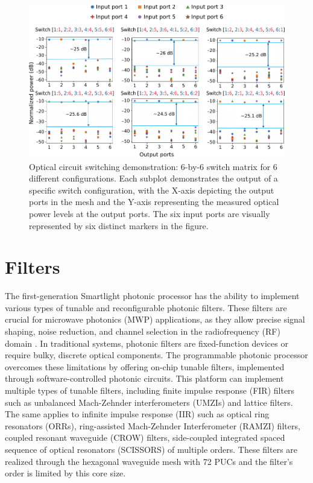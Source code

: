 \begin{figure}
	\begin{center}
		\includegraphics{figures/ch3-ocs_power_meter.pdf}
	\end{center}
	\caption{Optical circuit switching demonstration:
		6-by-6 switch matrix for 6 different configurations.
		Each subplot demonstrates the output of a specific switch configuration, with the X-axis depicting the output ports in the mesh and the Y-axis representing the measured optical power levels at the output ports.
		The six input ports are visually represented by six distinct markers in the figure.
	}\label{fig:ch3-ocs_power_meter}
\end{figure}


\section{Filters}\label{sec:filters} %

The first-generation Smartlight photonic processor has the ability to implement various types of tunable and reconfigurable photonic filters.
These filters are crucial for microwave photonics (MWP) applications, as they allow precise signal shaping, noise reduction, and channel selection in the radiofrequency (RF) domain \cite{marpaung_si3n4_2013,liu_integrated_2020,daulay_tutorial_2021}.
In traditional systems, photonic filters are fixed-function devices or require bulky, discrete optical components.
The programmable photonic processor overcomes these limitations by offering on-chip tunable filters, implemented through software-controlled photonic circuits.
This platform can implement multiple types of tunable filters, including finite impulse response (FIR) filters such as unbalanced Mach-Zehnder interferometers (UMZIs) and lattice filters.
The same applies to infinite impulse response (IIR) such as optical ring resonators (ORRs), ring-assisted Mach-Zehnder Interferometer (RAMZI) filters, coupled resonant waveguide (CROW) filters, side-coupled integrated spaced sequence of optical resonators (SCISSORS) of multiple orders.
These filters are realized through the hexagonal waveguide mesh with 72 PUCs and the filter's order is limited by this core size.

